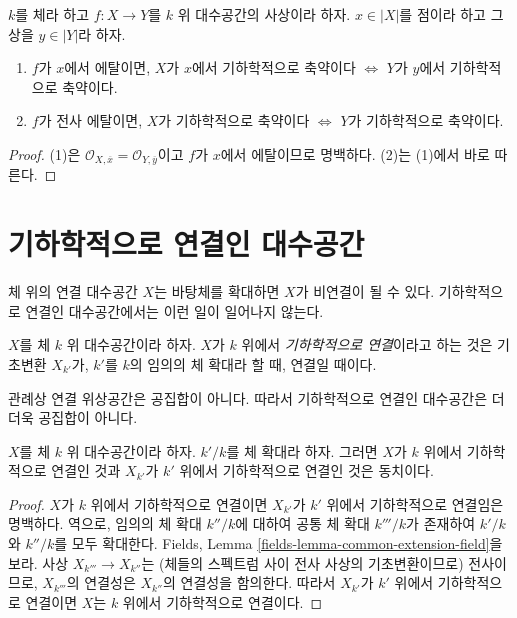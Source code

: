\begin{lemma}
\label{lemma-geometrically-reduced-etale-local}
$k$를 체라 하고 $f : X \to Y$를 $k$ 위 대수공간의 사상이라 하자.
$x \in |X|$를 점이라 하고 그 상을 $y \in |Y|$라 하자.
\begin{enumerate}
\item $f$가 $x$에서 에탈이면,
$X$가 $x$에서 기하학적으로 축약이다 $\Leftrightarrow$
$Y$가 $y$에서 기하학적으로 축약이다.
\item $f$가 전사 에탈이면,
$X$가 기하학적으로 축약이다 $\Leftrightarrow$
$Y$가 기하학적으로 축약이다.
\end{enumerate}
\end{lemma}

\begin{proof}
(1)은 $\mathcal{O}_{X, \overline{x}} = \mathcal{O}_{Y, \overline{y}}$이고
$f$가 $x$에서 에탈이므로 명백하다. (2)는 (1)에서 바로 따른다.
\end{proof}






\section{기하학적으로 연결인 대수공간}
\label{section-geometrically-connected}

\noindent
체 위의 연결 대수공간 $X$는 바탕체를 확대하면 $X$가 비연결이 될 수 있다.
기하학적으로 연결인 대수공간에서는 이런 일이 일어나지 않는다.

\begin{definition}
\label{definition-geometrically-connected}
$X$를 체 $k$ 위 대수공간이라 하자. $X$가 $k$ 위에서
{\it 기하학적으로 연결}이라고 하는 것은 기초변환 $X_{k'}$가, $k'$를
$k$의 임의의 체 확대라 할 때, 연결일 때이다.
\end{definition}

\noindent
관례상 연결 위상공간은 공집합이 아니다. 따라서 기하학적으로 연결인
대수공간은 더더욱 공집합이 아니다.

\begin{lemma}
\label{lemma-geometrically-connected-check-after-extension}
$X$를 체 $k$ 위 대수공간이라 하자.
$k'/k$를 체 확대라 하자.
그러면 $X$가 $k$ 위에서 기하학적으로 연결인 것과
$X_{k'}$가 $k'$ 위에서 기하학적으로 연결인 것은 동치이다.
\end{lemma}

\begin{proof}
$X$가 $k$ 위에서 기하학적으로 연결이면 $X_{k'}$가 $k'$ 위에서
기하학적으로 연결임은 명백하다. 역으로, 임의의 체 확대 $k''/k$에 대하여
공통 체 확대 $k'''/k$가 존재하여 $k'/k$와 $k''/k$를 모두 확대한다.
Fields, Lemma
\ref{fields-lemma-common-extension-field}을 보라. 사상
$X_{k'''} \to X_{k''}$는 (체들의 스펙트럼 사이 전사 사상의 기초변환이므로)
전사이므로, $X_{k'''}$의 연결성은 $X_{k''}$의 연결성을 함의한다. 따라서
$X_{k'}$가 $k'$ 위에서 기하학적으로 연결이면 $X$는 $k$ 위에서
기하학적으로 연결이다.
\end{proof}

